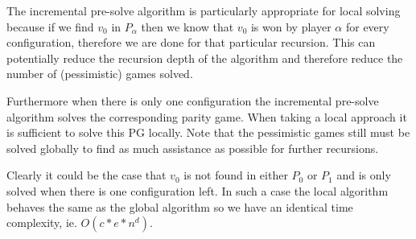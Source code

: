 The incremental pre-solve algorithm is particularly appropriate for local solving because if we find ${v}_0$ in  $P_\alpha$ then we know that ${v}_0$ is won by player $\alpha$ for every configuration, therefore we are done for that particular recursion. This can potentially reduce the recursion depth of the algorithm and therefore reduce the number of (pessimistic) games solved.

Furthermore when there is only one configuration the incremental pre-solve algorithm solves the corresponding parity game. When taking a local approach it is sufficient to solve this PG locally. Note that the pessimistic games still must be solved globally to find as much assistance as possible for further recursions.

Clearly it could be the case that $v_0$ is not found in either $P_0$ or $P_1$ and is only solved when there is one configuration left. In such a case the local algorithm behaves the same as the global algorithm so we have an identical time complexity, ie. $O(c*e*n^d)$.